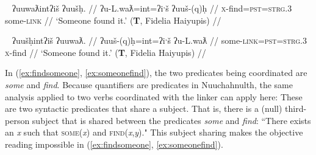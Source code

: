 \ex~ \label{ex:findsomeone}
\begingl
\glpreamble ʔuuwaƛintʔiš ʔuušḥ. //
\gla ʔu-L.waƛ=int=ʔiˑš ʔuuš-(q)ḥ //
\glb \textsc{x}-find=\textsc{pst}=\textsc{strg.3} some-\textsc{link} //
\glft `Someone found it.' (\textbf{T}, Fidelia Haiyupis) //
\endgl
\xe

\ex~ \label{ex:someonefind}
\begingl
\glpreamble ʔuušḥintʔiš ʔuuwaƛ. //
\gla ʔuuš-(q)ḥ=int=ʔiˑš ʔu-L.waƛ //
\glb some-\textsc{link}=\textsc{pst}=\textsc{strg.3} \textsc{x}-find //
\glft `Someone found it.' (\textbf{T}, Fidelia Haiyupis) //
\endgl
\xe


\begin{comment}
\ex \label{ex:findsomething}
\begingl
\glpreamble ʔuuwaʔaƛ ʔuuš.//
\gla ʔu-L.waƛ=!aƛ ʔuuš //
\glb \textsc{x}-find=\textsc{now} some //
\glft `He/she found something.' (*? Someone found it) (\textbf{C}, \textit{tupaat} Julia Lucas) //
\endgl
\xe

\ex~ \label{ex:*findsomething}
\begingl
\glpreamble *ʔuuš ʔuuwaʔaƛ.//
\gla ʔuuš ʔu-L.waƛ=!aƛ //
\glb some \textsc{x}-find=\textsc{now} //
\glft Intended: `He/she found something.' (\textbf{C}, \textit{tupaat} Julia Lucas) //
\endgl
\xe

\ex~ \label{ex:findsomeone}
\begingl
\glpreamble ʔuuwaʔaƛ ʔuušqḥ.//
\gla ʔu-L.waƛ=!aƛ ʔuuš-(q)ḥ //
\glb \textsc{x}-find=\textsc{now} some-\textsc{link} //
\glft `Someone found it.' (*He/she found something) (\textbf{C}, \textit{tupaat} Julia Lucas) //
\endgl
\xe

\ex~ \label{ex:someonefind}
\begingl
\glpreamble ʔuušqḥʔaƛ ʔuuwaƛ.//
\gla ʔuuš-(q)ḥ=!aƛ ʔu-L.waƛ //
\glb some-\textsc{link}=\textsc{now} \textsc{x}-find //
\glft `Someone found it.' (*He/she found something) (\textbf{C}, \textit{tupaat} Julia Lucas) //
\endgl
\xe

\ex \label{ex:someonefind2}
\begingl
\glpreamble ʔuušqḥ ʔuuwaʔaƛ.//
\gla ʔuuš-qḥ ʔu-L.waƛ=!aƛ //
\glb some-\textsc{link} \textsc{x}-find=\textsc{now} //
\glft `Someone found it.' (*He/she found something) //
\endgl
\xe
\end{comment}

In (\ref{ex:findsomeone}, \ref{ex:someonefind}), the two predicates being coordinated are \textit{some} and \textit{find}. Because quantifiers are predicates in Nuuchahnulth, the same analysis applied to two verbs coordinated with the linker can apply here: These are two syntactic predicates that share a subject. That is, there is a (null) third-person subject that is shared between the predicates \textit{some} and \textit{find}: ``There exists an \textit{x} such that \textsc{some}(\textit{x}) and \textsc{find}(\textit{x},\textit{y})." This subject sharing makes the objective reading impossible in (\ref{ex:findsomeone}, \ref{ex:someonefind}).

